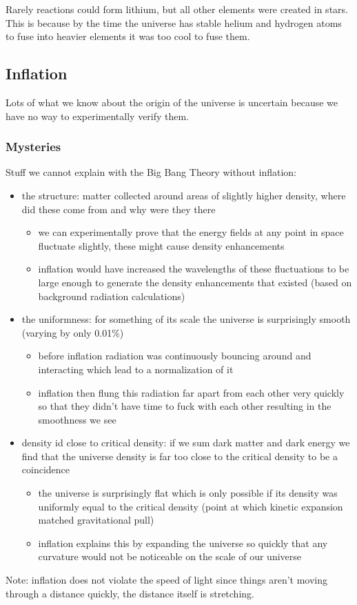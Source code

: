 Rarely reactions could form lithium, but all other elements were created in stars. This is because by the time the universe has stable helium and hydrogen atoms to fuse into heavier elements it was too cool to fuse them.

\subsection{Inflation}
Lots of what we know about the origin of the universe is uncertain because we have no way to experimentally verify them.

\subsubsection{Mysteries}
Stuff we cannot explain with the Big Bang Theory without inflation:
\begin{itemize}
    \item the structure: matter collected around areas of slightly higher density, where did these come from and why were they there
    \begin{itemize}
        \item we can experimentally prove that the energy fields at any point in space fluctuate slightly, these might cause density enhancements
        \item inflation would have increased the wavelengths of these fluctuations to be large enough to generate the density enhancements that existed (based on background radiation calculations)
    \end{itemize}
    \item the uniformness: for something of its scale the universe is surprisingly smooth (varying by only 0.01\%)
    \begin{itemize}
        \item before inflation radiation was continuously bouncing around and interacting which lead to a normalization of it
        \item inflation then flung this radiation far apart from each other very quickly so that they didn't have time to fuck with each other resulting in the smoothness we see
    \end{itemize}
    \item density id close to critical density: if we sum dark matter and dark energy we find that the universe density is far too close to the critical density to be a coincidence
    \begin{itemize}
        \item the universe is surprisingly flat which is only possible if its density was uniformly equal to the critical density (point at which kinetic expansion matched gravitational pull)
        \item inflation explains this by expanding the universe so quickly that any curvature would not be noticeable on the scale of our universe
    \end{itemize}
\end{itemize}
Note: inflation does not violate the speed of light since things aren't moving through a distance quickly, the distance itself is stretching.

